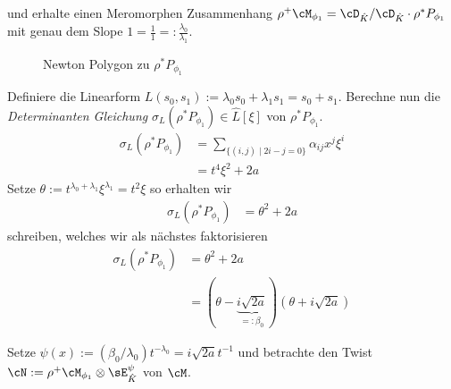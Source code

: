 \fi
und erhalte einen Meromorphen Zusammenhang $\rho^+\cM_{\phi_1}=\cD_{\hat
K}/\cD_{\hat K}\cdot\rho^*P_{\phi_1}$ mit genau dem Slope
$1=\frac{1}{1}=:\frac{\lambda_0}{\lambda_1}$.
\begin{figure}[H]
\begin{center}
\end{center}
\caption{Newton Polygon zu $\rho^*P_{\phi_1}$}
\end{figure}

\begin{comment}
TODO: Namenskollision: $\hat L$ und $L(s_0,s_1)$.
\end{comment}
Definiere die Linearform $L(s_0,s_1):=\lambda_0s_0+\lambda_1s_1=s_0+s_1$.
Berechne nun die \emph{Determinanten Gleichung} $\sigma_L(\rho^*P_{\phi_1})\in
\hat L[\xi]$ von $\rho^*P_{\phi_1}$.
\begin{align*}
\sigma_L(\rho^*P_{\phi_1})
  &= \sum_{\{(i,j)\mid 2i-j=0\}}\alpha_{ij}x^{j}\xi^i\\
  &= t^4\xi^2 + 2a
\end{align*}
Setze $\theta:=t^{\lambda_0+\lambda_1}\xi^{\lambda_1}=t^2\xi$ so erhalten wir
\begin{align*}
\sigma_L(\rho^*P_{\phi_1}) &= \theta^2 + 2a
\end{align*}
schreiben, welches wir als nächstes faktorisieren
\begin{align*}
\sigma_L(\rho^*P_{\phi_1}) &= \theta^2+2a\\
  &=(\theta-\underset{=:\beta_0}{\underbrace{i\sqrt{2a}}})
    (\theta+i\sqrt{2a})
\end{align*}
\begin{comment}
Definiere $R(t):=(\beta_0/(\lambda_0+1))t^{\lambda_0+1}=i\sqrt{2a}t^2$ und wir
wollen ein $\psi(t)$ so dass
\[
\frac{\partial R(t^{-1})}{\partial t} = \psi'(t)
\]
erhalte $\psi'(x)=\beta_0(x^{-1})^{\lambda_0}$
\end{comment}
\begin{comment}
TODO: korregiere allgemeinen Part, falls richtig!
\end{comment}
Setze $\psi(x):=(\beta_0/\lambda_0)t^{-\lambda_0}=i\sqrt{2a}t^{-1}$ und
betrachte den Twist $\cN:=\rho^+\cM_{\phi_1}\otimes\sE_{\hat K}^\psi$ von
$\cM$.
